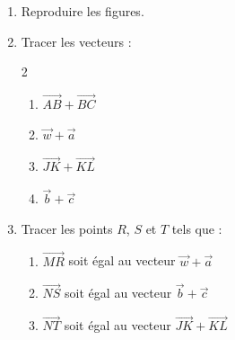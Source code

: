 \begin{exo}{}
	\begin{enumerate}
		\item Reproduire les figures.
		\item Tracer les vecteurs :
		      \vspace*{-2mm}
		      \begin{multicols}{2}
		      \begin{enumerate}
			      \item $\vec{AB} + \vec{BC}$
			      \item $\vec{w} + \vec{a}$
			      \item $\vec{JK} + \vec{KL}$
			      \item $\vec{b} + \vec{c}$
		      \end{enumerate}
		      \end{multicols}
		      \vspace*{-2mm}
		\item Tracer les points $R$, $S$ et $T$ tels que :
		      \begin{enumerate}
			      \item $\vec{MR}$ soit égal au vecteur $\vec{w} + \vec{a}$
			      \item $\vec{NS}$ soit égal au vecteur $\vec{b} + \vec{c}$
			      \item $\vec{NT}$ soit égal au vecteur $\vec{JK} + \vec{KL}$
		      \end{enumerate}
	\end{enumerate}
\end{exo}

